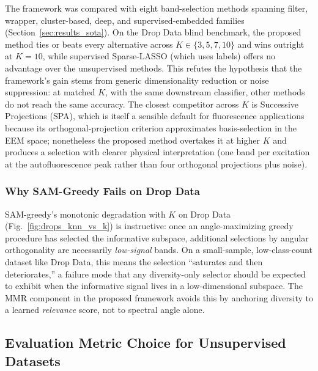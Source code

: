 The framework was compared with eight band-selection methods spanning filter, wrapper, cluster-based, deep, and supervised-embedded families (Section~\ref{sec:results_sota}).
On the Drop Data blind benchmark, the proposed method ties or beats every alternative across $K \in \{3,5,7,10\}$ and wins outright at $K=10$, while supervised Sparse-LASSO (which uses labels) offers no advantage over the unsupervised methods.
This refutes the hypothesis that the framework's gain stems from generic dimensionality reduction or noise suppression: at matched $K$, with the same downstream classifier, other methods do not reach the same accuracy.
The closest competitor across $K$ is Successive Projections (SPA), which is itself a sensible default for fluorescence applications because its orthogonal-projection criterion approximates basis-selection in the EEM space; nonetheless the proposed method overtakes it at higher $K$ and produces a selection with clearer physical interpretation (one band per excitation at the autofluorescence peak rather than four orthogonal projections plus noise).

\subsubsection{Why SAM-Greedy Fails on Drop Data}
SAM-greedy's monotonic degradation with $K$ on Drop Data (Fig.~\ref{fig:drops_knn_vs_k}) is instructive: once an angle-maximizing greedy procedure has selected the informative subspace, additional selections by angular orthogonality are necessarily \emph{low-signal} bands.
On a small-sample, low-class-count dataset like Drop Data, this means the selection ``saturates and then deteriorates,'' a failure mode that any diversity-only selector should be expected to exhibit when the informative signal lives in a low-dimensional subspace.
The MMR component in the proposed framework avoids this by anchoring diversity to a learned \emph{relevance} score, not to spectral angle alone.

\subsection{Evaluation Metric Choice for Unsupervised Datasets}
\label{sec:discussion_metric_choice}

